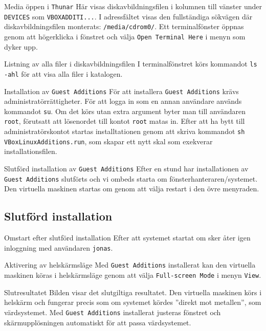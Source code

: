            {Media öppen i \texttt{Thunar}}
           {Här visas diskavbildningsfilen i kolumnen till vänster under
            \texttt{DEVICES} som \texttt{VBOXADDITI...}. I adressfältet visas
            den fullständiga sökvägen där diskavbildningsfilen monterats:
            \texttt{/media/cdrom0/}. Ett terminalfönster öppnas genom att
            högerklicka i fönstret och välja \texttt{Open Terminal Here} i
            menyn som dyker upp.}
           {}

           {Listning av alla filer i diskavbildningsfilen}
           {I terminalfönstret körs kommandot \texttt{ls -ahl} för att visa
            alla filer i katalogen.}
           {}

           {Installation av \texttt{Guest Additions}}
           {För att installera \texttt{Guest Additions} krävs
            administratörrättigheter. För att logga in som en annan användare
            används kommandot \texttt{su}. Om det körs utan extra argument 
            byter man till användaren \texttt{root}, förutsatt att lösenordet
            till kontot \texttt{root} matas in. Efter att ha bytt till
            administratörskontot startas installtationen genom att skriva
            kommandot \texttt{sh VBoxLinuxAdditions.run}, som skapar ett nytt
            skal som exekverar installationsfilen.}
           {}

           {Slutförd installation av \texttt{Guest Additions}}
           {Efter en stund har installationen av \texttt{Guest Additions}
            slutförts och vi ombeds starta om fönsterhanteraren/systemet.
            Den virtuella maskinen startas om genom att välja restart i 
            den övre menyraden.}
           {}


\subsection{Slutförd installation}

           {Omstart efter slutförd installation}
           {Efter att systemet startat om sker åter igen inloggning med
            användaren \texttt{jonas}.}
           {}

           {Aktivering av helskärmsläge}
           {Med \texttt{Guest Additions} installerat kan den virtuella maskinen
            köras i helskärmsläge genom att välja \texttt{Full-screen Mode} i
            menyn \texttt{View}.}
           {}

           {Slutresultatet}
           {Bilden visar det slutgiltiga resultatet. Den virtuella maskinen
            körs i helskärm och fungerar precis som om systemet kördes
            ''direkt mot metallen'', som värdsystemet.
            Med \texttt{Guest Additions} installerat justeras fönstret och
            skärmupplösningen automatiskt för att passa värdsystemet.}
           {}

